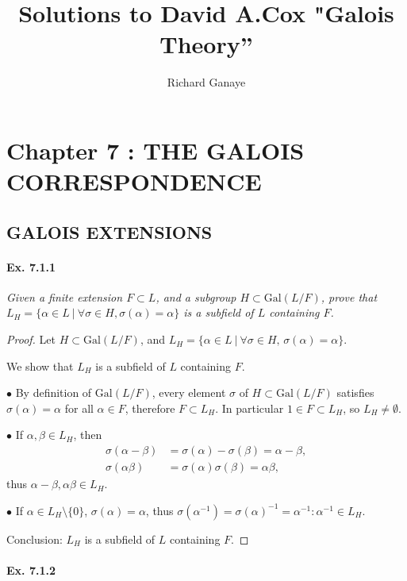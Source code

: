 \documentclass[11pt,a4paper]{article}
\title{Solutions to David A.Cox  "Galois Theory''}
\author{Richard Ganaye}
\newcommand{\Gal}{\mathrm{Gal}}
\begin{document}
\maketitle

\section{Chapter 7 : THE GALOIS CORRESPONDENCE}

\subsection{GALOIS EXTENSIONS}

\paragraph{Ex. 7.1.1}

{\it Given a finite extension $F \subset L$, and a subgroup $H \subset \Gal(L/F)$, prove that  $L_H = \{\alpha \in L \ | \ \forall \sigma \in H, \sigma(\alpha) = \alpha\}$ is a subfield of $L$ containing $F$.
}

\begin{proof}
Let $H \subset \Gal(L/F)$, and $L_H =\{\alpha \in L \ \vert \ \forall \sigma \in H,\, \sigma(\alpha) = \alpha\}$.

We show that $L_H$ is a subfield of $L$ containing $F$.

$\bullet$  By definition of $\Gal(L/F)$, every element $\sigma$ of $H\subset \Gal(L/F)$ satisfies $\sigma(\alpha) = \alpha$ for all $\alpha \in F$, therefore $F \subset L_H$. In particular $1 \in F \subset L_H $, so  $L_H \neq \emptyset$.

$\bullet$ If $\alpha, \beta \in L_H$, then 
\begin{align*}
\sigma(\alpha - \beta) &= \sigma(\alpha)- \sigma(\beta) = \alpha- \beta,\\
\sigma(\alpha \beta) &= \sigma(\alpha) \sigma(\beta) = \alpha \beta,
\end{align*}
thus $\alpha-\beta, \alpha \beta \in L_H$.

$\bullet$ If $\alpha \in L_H\setminus\{0\}$, $\sigma(\alpha) = \alpha$, thus $\sigma(\alpha^{-1}) = \sigma(\alpha)^{-1} = \alpha^{-1}: \alpha^{-1} \in L_H$.

Conclusion: $L_H$ is a subfield of $L$ containing $F$.
\end{proof}

\paragraph{Ex. 7.1.2}
\end{document}
